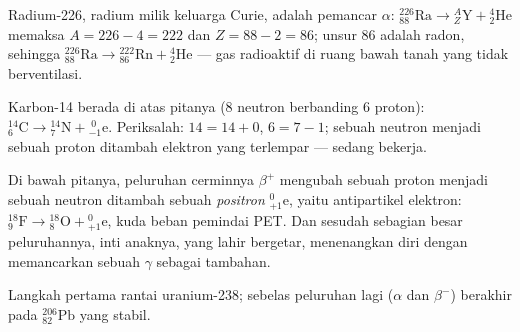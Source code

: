 \begin{example}\label{ex:g11:nucleus-radioactivity:alpha}
Radium-226, radium milik keluarga Curie, adalah pemancar $\alpha$:
${}^{226}_{88}\mathrm{Ra} \to {}^{A}_{Z}\mathrm{Y} + {}^{4}_{2}\mathrm{He}$
memaksa $A = 226 - 4 = 222$ dan $Z = 88 - 2 = 86$; unsur $86$ adalah radon,
sehingga
${}^{226}_{88}\mathrm{Ra} \to {}^{222}_{86}\mathrm{Rn} + {}^{4}_{2}\mathrm{He}$
--- gas radioaktif di ruang bawah tanah yang tidak berventilasi.
\end{example}

\begin{example}\label{ex:g11:nucleus-radioactivity:beta}
Karbon-14 berada di atas pitanya ($8$ neutron berbanding $6$ proton):
${}^{14}_{6}\mathrm{C} \to {}^{14}_{7}\mathrm{N} + {}^{\;0}_{-1}\mathrm{e}$.
Periksalah: $14 = 14 + 0$, $6 = 7 - 1$; sebuah neutron menjadi sebuah proton
ditambah elektron yang terlempar ---  sedang bekerja.
\end{example}

\begin{remark}\label{rem:g11:nucleus-radioactivity:betaplus}
Di bawah pitanya, peluruhan cerminnya $\beta^+$ mengubah sebuah proton
menjadi sebuah neutron ditambah sebuah \emph{positron}
${}^{0}_{+1}\mathrm{e}$, yaitu antipartikel elektron:
${}^{18}_{9}\mathrm{F} \to {}^{18}_{8}\mathrm{O} + {}^{0}_{+1}\mathrm{e}$,
kuda beban pemindai PET. Dan sesudah sebagian besar peluruhannya, inti
anaknya, yang lahir bergetar, menenangkan diri dengan memancarkan sebuah
$\gamma$ sebagai tambahan.
\end{remark}

\begin{omfigure}

{\small Langkah pertama rantai uranium-238; sebelas peluruhan lagi
($\alpha$ dan $\beta^-$) berakhir pada ${}^{206}_{82}\mathrm{Pb}$ yang
stabil.}
\end{omfigure}

